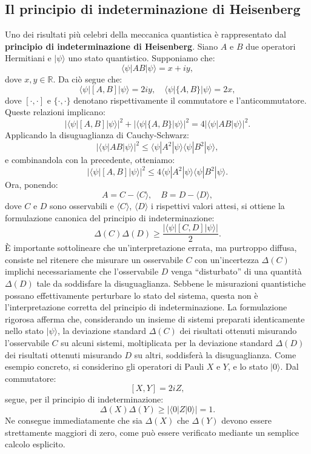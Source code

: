 \documentclass[a4paper,12pt]{report}
\theoremstyle{plain}
\begin{document}
\subsection*{Il principio di indeterminazione di Heisenberg}
Uno dei risultati più celebri della meccanica quantistica è rappresentato dal \textbf{principio di indeterminazione di Heisenberg}. Siano $A$ e $B$ due operatori Hermitiani e $|\psi\rangle$ uno stato quantistico. Supponiamo che:
\[
\langle \psi | AB | \psi \rangle = x + iy,
\]
dove $x, y \in \mathbb{R}$. Da ciò segue che:
\[
\langle \psi | [A, B] | \psi \rangle = 2iy, \quad \langle \psi | \{A, B\} | \psi \rangle = 2x,
\]
dove $[\cdot,\cdot]$ e $\{\cdot,\cdot\}$ denotano rispettivamente il commutatore e l'anticommutatore. Queste relazioni implicano:
\[
|\langle \psi | [A, B] | \psi \rangle|^2 + |\langle \psi | \{A, B\} | \psi \rangle|^2 = 4|\langle \psi | AB | \psi \rangle|^2.
\]
Applicando la disuguaglianza di Cauchy-Schwarz:
\[
|\langle \psi | AB | \psi \rangle|^2 \leq \langle \psi | A^2 | \psi \rangle \langle \psi | B^2 | \psi \rangle,
\]
e combinandola con la precedente, otteniamo:
\[
|\langle \psi | [A, B] | \psi \rangle|^2 \leq 4 \langle \psi | A^2 | \psi \rangle \langle \psi | B^2 | \psi \rangle.
\]
Ora, ponendo:
\[
A = C - \langle C \rangle, \quad B = D - \langle D \rangle,
\]
dove $C$ e $D$ sono osservabili e $\langle C \rangle$, $\langle D \rangle$ i rispettivi valori attesi, si ottiene la formulazione canonica del principio di indeterminazione:
\[
\Delta(C) \Delta(D) \geq \frac{|\langle \psi | [C, D] | \psi \rangle|}{2}.
\]
È importante sottolineare che un'interpretazione errata, ma purtroppo diffusa, consiste nel ritenere che misurare un osservabile $C$ con un'incertezza $\Delta(C)$ implichi necessariamente che l'osservabile $D$ venga ``disturbato'' di una quantità $\Delta(D)$ tale da soddisfare la disuguaglianza. Sebbene le misurazioni quantistiche possano effettivamente perturbare lo stato del sistema, questa non è l'interpretazione corretta del principio di indeterminazione.
La formulazione rigorosa afferma che, considerando un insieme di sistemi preparati identicamente nello stato $|\psi\rangle$, la deviazione standard $\Delta(C)$ dei risultati ottenuti misurando l'osservabile $C$ su alcuni sistemi, moltiplicata per la deviazione standard $\Delta(D)$ dei risultati ottenuti misurando $D$ su altri, soddisferà la disuguaglianza.
Come esempio concreto, si considerino gli operatori di Pauli $X$ e $Y$, e lo stato $|0\rangle$. Dal commutatore:
\[
[X, Y] = 2iZ,
\]
segue, per il principio di indeterminazione:
\[
\Delta(X)\Delta(Y) \geq |\langle 0 | Z | 0 \rangle| = 1.
\]
Ne consegue immediatamente che sia $\Delta(X)$ che $\Delta(Y)$ devono essere strettamente maggiori di zero, come può essere verificato mediante un semplice calcolo esplicito.
\end{document}
